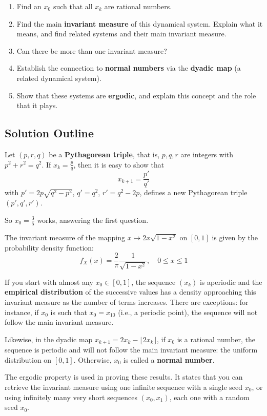 \documentclass[12pt,a4paper]{article}
\begin{document}
\begin{enumerate}
    \item Find an $x_0$ such that all $x_k$ are rational numbers.
    \item Find the main \textbf{invariant measure} of this dynamical system. Explain what it means, and find related systems and their main invariant measure.
    \item Can there be more than one invariant measure?
    \item Establish the connection to \textbf{normal numbers} via the \textbf{dyadic map} (a related dynamical system).
    \item Show that these systems are \textbf{ergodic}, and explain this concept and the role that it plays.
\end{enumerate}

\subsection{Solution Outline}

Let $(p, r, q)$ be a \textbf{Pythagorean triple}, that is, $p, q, r$ are integers with $p^2 + r^2 = q^2$. If $x_k = \frac{p}{q}$, then it is easy to show that
\[
x_{k+1} = \frac{p'}{q'}
\]
with $p' = 2p\sqrt{q^2 - p^2}$, $q' = q^2$, $r' = q^2 - 2p$, defines a new Pythagorean triple $(p', q', r')$. 

So $x_0 = \frac{3}{5}$ works, answering the first question.

The invariant measure of the mapping $x \mapsto 2x\sqrt{1-x^2}$ on $[0, 1]$ is given by the probability density function:
\[
f_X(x) = \frac{2}{\pi}\frac{1}{\sqrt{1-x^2}}, \quad 0 \leq x \leq 1
\]

If you start with almost any $x_0 \in [0,1]$, the sequence $(x_k)$ is aperiodic and the \textbf{empirical distribution} of the successive values has a density approaching this invariant measure as the number of terms increases. There are exceptions: for instance, if $x_0$ is such that $x_0 = x_{10}$ (i.e., a periodic point), the sequence will not follow the main invariant measure.

Likewise, in the dyadic map $x_{k+1} = 2x_k - \lfloor 2x_k \rfloor$, if $x_0$ is a rational number, the sequence is periodic and will not follow the main invariant measure: the uniform distribution on $[0,1]$. Otherwise, $x_0$ is called a \textbf{normal number}.

The ergodic property is used in proving these results. It states that you can retrieve the invariant measure using one infinite sequence with a single seed $x_0$, or using infinitely many very short sequences $(x_0, x_1)$, each one with a random seed $x_0$.
\end{document}
